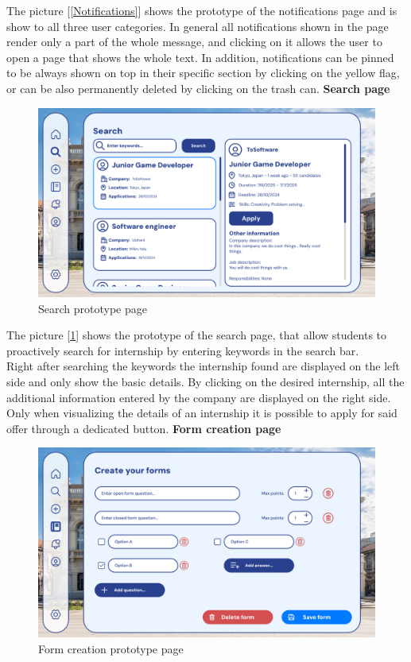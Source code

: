 \documentclass[11pt,twoside]{article}
\begin{document}
The picture [\ref{Notifications}] shows the prototype of the notifications page and is show to all three user categories. In general all notifications shown in the page render only a part of the whole message, and clicking on it allows the user to open a page that shows the whole text. In addition, notifications can be pinned to be always shown on top in their specific section by clicking on the yellow flag, or can be also permanently deleted by clicking on the trash can.
\newpage
\large{\textbf{Search page}}
\begin{figure}[H]
\includegraphics[width=\textwidth]{Images/Search}
\caption{Search prototype page}\label{Search}
\end{figure}
The picture [\ref{Search}] shows the prototype of the search page, that allow students to proactively search for internship by entering keywords in the search bar.\\
Right after searching the keywords the internship found are displayed on the left side and only show the basic details. By clicking on the desired internship, all the additional information entered by the company are displayed on the right side. Only when visualizing the details of an internship it is possible to apply for said offer through a dedicated button.
\newpage
\large{\textbf{Form creation page}}
\begin{figure}[H]
\includegraphics[width=\textwidth]{Images/Create form}
\caption{Form creation prototype page}\label{Form}
\end{figure}
\end{document}
